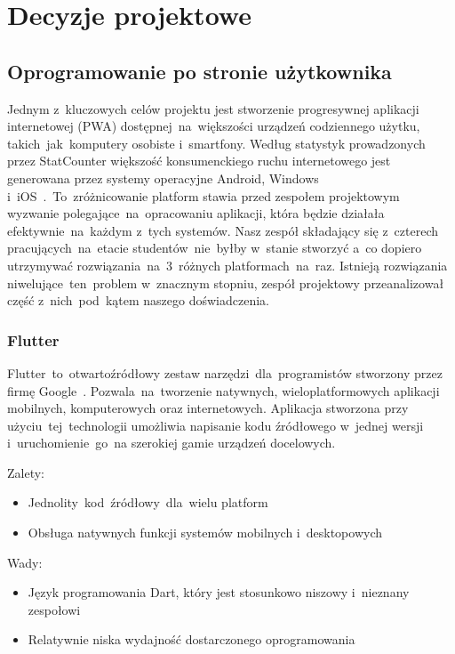 
\chapter{Decyzje projektowe}
\label{ch:decyzje-projektowe}

\section{Oprogramowanie po stronie użytkownika}
\label{sec:oprogramowanie-po-stronie-uzytkownika}
Jednym z~kluczowych celów projektu jest stworzenie progresywnej aplikacji internetowej (PWA) dostępnej~na~większości urządzeń codziennego użytku, takich~jak~komputery osobiste i~smartfony.
Według statystyk prowadzonych przez StatCounter większość konsumenckiego ruchu internetowego jest generowana przez systemy operacyjne Android, Windows i~iOS~\cite{statcounter-os-shares}\@.~To~zróżnicowanie platform stawia przed zespołem projektowym wyzwanie polegające~na~opracowaniu aplikacji, która będzie działała efektywnie~na~każdym z~tych systemów.
Nasz zespół składający się z~czterech pracujących~na~etacie studentów~nie~byłby w~stanie stworzyć a~co dopiero utrzymywać rozwiązania~na~3~różnych platformach~na~raz.
Istnieją rozwiązania niwelujące~ten~problem w~znacznym stopniu, zespół projektowy przeanalizował część z~nich~pod~kątem naszego doświadczenia.

\subsection{Flutter}\label{subsec:flutter}
Flutter~to~otwartoźródłowy zestaw narzędzi~dla~programistów stworzony przez firmę Google~\cite{flutter-quick-start}.
Pozwala~na~tworzenie natywnych, wieloplatformowych aplikacji mobilnych, komputerowych oraz internetowych.
Aplikacja stworzona przy użyciu~tej~technologii umożliwia napisanie kodu źródłowego w~jednej wersji i~uruchomienie~go~na szerokiej gamie urządzeń docelowych.

Zalety:
\begin{itemize}
    \item Jednolity~kod~źródłowy~dla~wielu platform
    \item Obsługa natywnych funkcji systemów mobilnych i~desktopowych
\end{itemize}

Wady:
\begin{itemize}
    \item Język programowania Dart, który jest stosunkowo niszowy i~nieznany zespołowi
    \item Relatywnie niska wydajność dostarczonego oprogramowania\cite{flutter-perf}
\end{itemize}

